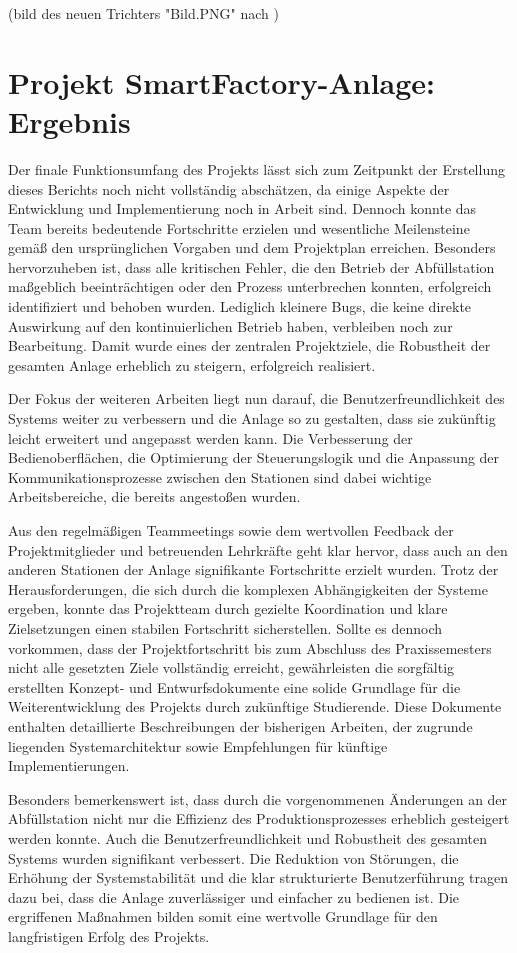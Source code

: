 (bild des neuen Trichters "Bild.PNG" nach )

\section{Projekt SmartFactory-Anlage: Ergebnis}\label{sec:Projekt_SmartFactory-Anlage:_Ergebnis}

Der finale Funktionsumfang des Projekts lässt sich zum Zeitpunkt der Erstellung dieses Berichts noch nicht vollständig abschätzen, da einige 
Aspekte der Entwicklung und Implementierung noch in Arbeit sind. Dennoch konnte das Team bereits bedeutende Fortschritte erzielen und wesentliche 
Meilensteine gemäß den ursprünglichen Vorgaben und dem Projektplan erreichen. Besonders hervorzuheben ist, dass alle kritischen Fehler, die den 
Betrieb der Abfüllstation maßgeblich beeinträchtigen oder den Prozess unterbrechen konnten, erfolgreich identifiziert und behoben wurden. 
Lediglich kleinere Bugs, die keine direkte Auswirkung auf den kontinuierlichen Betrieb haben, verbleiben noch zur Bearbeitung. Damit wurde 
eines der zentralen Projektziele, die Robustheit der gesamten Anlage erheblich zu steigern, erfolgreich realisiert.

Der Fokus der weiteren Arbeiten liegt nun darauf, die Benutzerfreundlichkeit des Systems weiter zu verbessern und die Anlage so zu gestalten, 
dass sie zukünftig leicht erweitert und angepasst werden kann. Die Verbesserung der Bedienoberflächen, die Optimierung der Steuerungslogik und 
die Anpassung der Kommunikationsprozesse zwischen den Stationen sind dabei wichtige Arbeitsbereiche, die bereits angestoßen wurden.

Aus den regelmäßigen Teammeetings sowie dem wertvollen Feedback der Projektmitglieder und betreuenden Lehrkräfte geht klar hervor, dass auch an 
den anderen Stationen der Anlage signifikante Fortschritte erzielt wurden. Trotz der Herausforderungen, die sich durch die komplexen 
Abhängigkeiten der Systeme ergeben, konnte das Projektteam durch gezielte Koordination und klare Zielsetzungen einen stabilen Fortschritt 
sicherstellen. Sollte es dennoch vorkommen, dass der Projektfortschritt bis zum Abschluss des Praxissemesters nicht alle gesetzten Ziele 
vollständig erreicht, gewährleisten die sorgfältig erstellten Konzept- und Entwurfsdokumente eine solide Grundlage für die Weiterentwicklung 
des Projekts durch zukünftige Studierende. Diese Dokumente enthalten detaillierte Beschreibungen der bisherigen Arbeiten, der zugrunde liegenden 
Systemarchitektur sowie Empfehlungen für künftige Implementierungen.

Besonders bemerkenswert ist, dass durch die vorgenommenen Änderungen an der Abfüllstation nicht nur die Effizienz des Produktionsprozesses 
erheblich gesteigert werden konnte. Auch die Benutzerfreundlichkeit und Robustheit des gesamten Systems wurden signifikant verbessert. 
Die Reduktion von Störungen, die Erhöhung der Systemstabilität und die klar strukturierte Benutzerführung tragen dazu bei, dass die Anlage 
zuverlässiger und einfacher zu bedienen ist. Die ergriffenen Maßnahmen bilden somit eine wertvolle Grundlage für den langfristigen Erfolg 
des Projekts.

